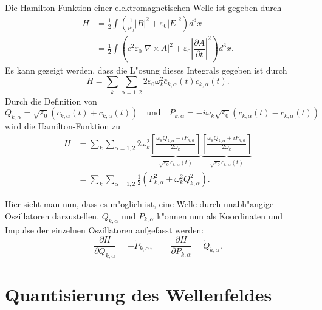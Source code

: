 \begin{refsection}
Die Hamilton-Funktion einer elektromagnetischen Welle ist gegeben durch
\begin{equation*}
\begin{split}
H &= \frac{1}{2} \int \left(\frac{1}{\mu_0}|B|^2 + \varepsilon_0|E|^2\right) d^3 x \\
	&= \frac{1}{2} \int \left(c^2 \varepsilon_0 | \nabla\times A |^2 + \varepsilon_0 \left| \dfrac{\partial A}{\partial t} \right|^2 \right) d^3 x.
\end{split}
\end{equation*}
Es kann gezeigt werden, dass die L"osung dieses Integrals gegeben ist durch
\begin{equation*}
H = \sum_k \sum_{\alpha=1,2} 2 \varepsilon_0 \omega_k^2 \bar{c}_{k,\alpha}(t) c_{k,\alpha}(t).
\end{equation*}
Durch die Definition von 
\begin{equation*}
Q_{k,\alpha} = \sqrt{\varepsilon_0} \left(c_{k,\alpha}(t) + \bar{c}_{k,\alpha}(t)\right) \quad \text{und} \quad P_{k,\alpha} = -i \omega_k \sqrt{\varepsilon_0} \left(c_{k,\alpha}(t) - \bar{c}_{k,\alpha}(t)\right)
\end{equation*}
wird die Hamilton-Funktion zu
\begin{equation} \label{fq:hamilton}
\begin{split}
H &= \sum_k \sum_{\alpha=1,2} 2 \omega_k^2 
	\underbrace{\left[ \frac{\omega_k Q_{k,\alpha} - i P_{k,\alpha}}{2 \omega_k} \right]}_{\sqrt{\varepsilon_0} \bar{c}_{k,\alpha}(t)}
	\underbrace{\left[ \frac{\omega_k Q_{k,\alpha} + i P_{k,\alpha}}{2 \omega_k} \right]}_{\sqrt{\varepsilon_0} c_{k,\alpha}(t)} \\
&= \sum_k \sum_{\alpha=1,2} \frac{1}{2} \left(P_{k,\alpha}^2 + \omega_k^2 Q_{k,\alpha}^2\right).
\end{split}
\end{equation}

Hier sieht man nun, dass es m"oglich ist, eine Welle durch unabh"angige Oszillatoren darzustellen.
$Q_{k,\alpha}$ und $P_{k,\alpha}$ k"onnen nun als Koordinaten und Impulse der einzelnen Oszillatoren aufgefasst werden:
\begin{equation*}
\dfrac{\partial H}{\partial Q_{k,\alpha}} = -\dot{P}_{k,\alpha}, \qquad \dfrac{\partial H}{\partial P_{k,\alpha}} = \dot{Q}_{k,\alpha}.
\end{equation*}

\section{Quantisierung des Wellenfeldes}


\end{refsection}
